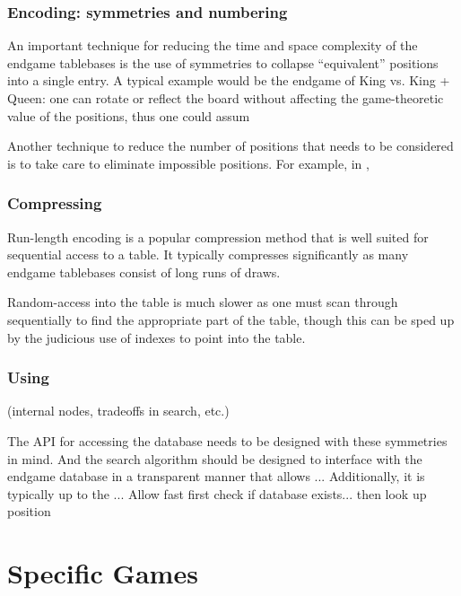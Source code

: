 \documentclass[10pt,dvipdfmx,letterpaper]{report}
\newcommand{\g}[1]{{\sc{#1}}\index{{\sc{#1}}}}
\begin{document}
\section{Encoding: symmetries and numbering}

An important technique for reducing the time and space complexity of the endgame tablebases
is the use of symmetries to collapse ``equivalent'' positions into a single entry.  A typical example
would be the \g{chess} endgame of King vs. King + Queen: one can rotate or reflect the board without
affecting the game-theoretic value of the positions, thus one could assum

Another technique to reduce the number of positions that needs to be considered is to take care to
eliminate impossible positions.  For example, in \g{chess}, 

\section{Compressing}

Run-length encoding is a popular compression method that is well suited for sequential access to
a table.  It typically compresses significantly as many endgame tablebases consist of long runs
of draws.

Random-access into the table is much slower as one must scan through sequentially to find the appropriate
part of the table, though this can be sped up by the judicious use of indexes to point into the table.

\section{Using}
(internal nodes, tradeoffs in search, etc.)

The API for accessing the database needs to be designed with these symmetries in mind.
And the search algorithm should be designed to interface with the endgame database in a transparent
manner that allows ...
Additionally, it is typically up to the ...
Allow fast first check if database exists...  then look up position


\part{Specific Games}
\end{document}
